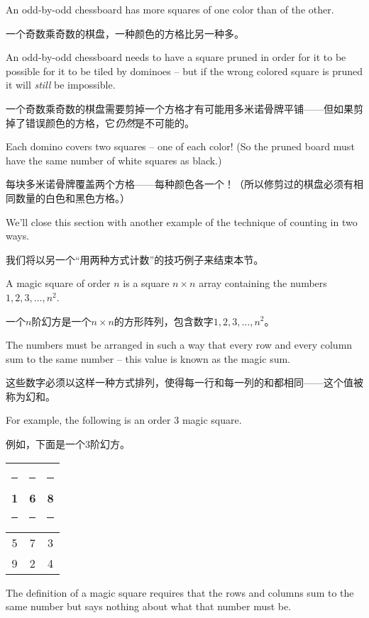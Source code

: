 An odd-by-odd chessboard has more squares of one color than of the other.

一个奇数乘奇数的棋盘，一种颜色的方格比另一种多。

An odd-by-odd chessboard needs to have a square pruned in order for it to
be possible for it to be tiled by dominoes -- but if the wrong colored
square is pruned it will \emph{still} be impossible.

一个奇数乘奇数的棋盘需要剪掉一个方格才有可能用多米诺骨牌平铺——但如果剪掉了错误颜色的方格，它\emph{仍然}是不可能的。

Each domino covers
two squares -- one of each color!  (So the pruned board must have the 
same number of white squares as black.) 

每块多米诺骨牌覆盖两个方格——每种颜色各一个！（所以修剪过的棋盘必须有相同数量的白色和黑色方格。）

We'll close this section with another example of the technique of
counting in two ways.

我们将以另一个“用两种方式计数”的技巧例子来结束本节。

A  magic square of order $n$ is a square 
$n \times n$ array 
containing the numbers $1, 2, 3, \ldots , n^2$.

一个$n$阶幻方是一个$n \times n$的方形阵列，包含数字$1, 2, 3, \ldots , n^2$。

The numbers must 
be arranged in such a way that every row and every column sum to
the same number -- this value is known as the magic sum.

这些数字必须以这样一种方式排列，使得每一行和每一列的和都相同——这个值被称为幻和。

For example, the following is an order $3$ magic square.

例如，下面是一个3阶幻方。

\begin{center}
\begin{tabular}{c|c|c}
\rule[-4pt]{0pt}{20pt}\rule{5pt}{0pt} 1 \rule{5pt}{0pt} & \rule{5pt}{0pt} 6 \rule{5pt}{0pt} & \rule{5pt}{0pt} 8 \rule{5pt}{0pt} \\ \hline
\rule[-4pt]{0pt}{20pt} 5 & 7 & 3 \\ \hline
\rule[-4pt]{0pt}{20pt} 9 & 2 & 4 \\
\end{tabular}
\end{center}

The definition of a magic square requires that the rows and columns sum to 
the same number but says nothing about what that number must be.

